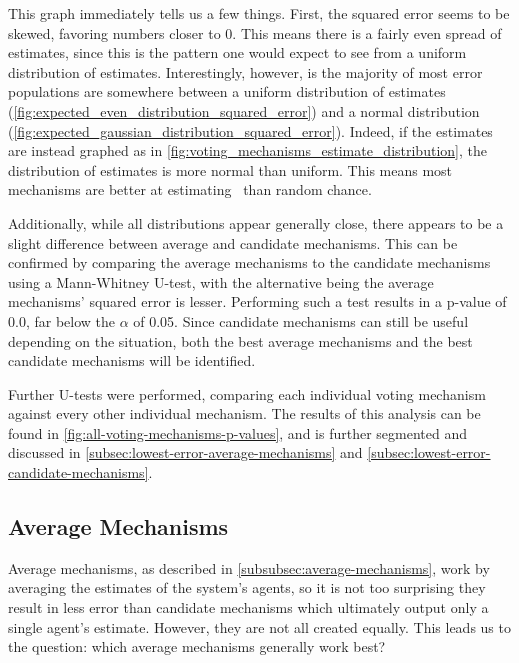 This graph immediately tells us a few things.
First, the squared error seems to be skewed, favoring numbers closer to 0.
This means there is a fairly even spread of estimates, since this is the
pattern one would expect to see from a uniform distribution of estimates.
Interestingly, however, is the majority of most error populations are
somewhere between a uniform distribution of estimates
(\autoref{fig:expected_even_distribution_squared_error}) and a normal
distribution (\autoref{fig:expected_gaussian_distribution_squared_error}).
Indeed, if the estimates are instead graphed as in
\autoref{fig:voting_mechanisms_estimate_distribution}, the distribution of estimates
is more normal than uniform.
This means most mechanisms are better at estimating \truth\ than random chance.


Additionally, while all distributions appear generally close, there appears to be a
slight difference between average and candidate mechanisms.
This can be confirmed by comparing the average mechanisms to the candidate mechanisms
using a Mann-Whitney U-test, with the alternative being the average mechanisms'
squared error is lesser.
Performing such a test results in a p-value of 0.0, far below the $\alpha$ of 0.05.
Since candidate mechanisms can still be useful depending on the situation, both the
best average mechanisms and the best candidate mechanisms will be identified.

Further U-tests were performed, comparing each individual voting mechanism against
every other individual mechanism.
The results of this analysis can be found in
\autoref{fig:all-voting-mechanisms-p-values}, and is further segmented and discussed in
\autoref{subsec:lowest-error-average-mechanisms} and
\autoref{subsec:lowest-error-candidate-mechanisms}.

\subsection{Average Mechanisms}\label{subsec:lowest-error-average-mechanisms}
Average mechanisms, as described in \autoref{subsubsec:average-mechanisms}, work by
averaging the estimates of the system's agents, so it is not too surprising they
result in less error than candidate mechanisms which ultimately output only a single
agent's estimate.
However, they are not all created equally.
This leads us to the question: which average mechanisms generally work best?

